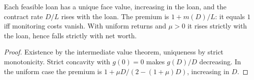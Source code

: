 \begin{theorem}
\label{thm:bgg}
\leanok
{}
Each feasible loan has a unique face value, increasing in the loan, and the contract rate $D/L$ rises with the loan. The premium is
$1+m(D)/L$: it equals $1$ iff monitoring costs vanish. With uniform returns and $\mu>0$ it rises strictly with the loan, hence falls
strictly with net worth.
\end{theorem}
\begin{proof}
\leanok
Existence by the intermediate value theorem, uniqueness by strict monotonicity. Strict concavity with $g(0)=0$ makes $g(D)/D$
decreasing. In the uniform case the premium is $1+\mu D/(2-(1+\mu)D)$, increasing in $D$.
\end{proof}
